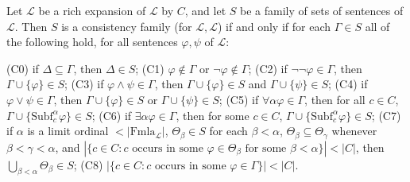 Let $\mathcal{L}$ be a rich expansion of $\mathcal{L}$ by $C$, and let $S$ be a family of sets of sentences of $\mathcal{L}$. Then $S$ is a consistency family (for $\mathcal{L}, \mathcal{L}$) if and only if for each $\Gamma \in S$ all of the following hold, for all sentences $\varphi, \psi$ of $\mathcal{L}$:

(C0) if $\Delta \subseteq \Gamma$, then $\Delta \in S$;
(C1) $\varphi \notin \Gamma$ or $\neg\varphi \notin \Gamma$;
(C2) if $\neg\neg\varphi \in \Gamma$, then $\Gamma \cup \{\varphi\} \in S$;
(C3) if $\varphi \wedge \psi \in \Gamma$, then $\Gamma \cup \{\varphi\} \in S$ and $\Gamma \cup \{\psi\} \in S$;
(C4) if $\varphi \vee \psi \in \Gamma$, then $\Gamma \cup \{\varphi\} \in S$ or $\Gamma \cup \{\psi\} \in S$;
(C5) if $\forall\alpha\varphi \in \Gamma$, then for all $c \in C$, $\Gamma \cup \{\text{Subf}_c^\alpha\varphi\} \in S$;
(C6) if $\exists\alpha\varphi \in \Gamma$, then for some $c \in C$, $\Gamma \cup \{\text{Subf}_c^\alpha\varphi\} \in S$;
(C7) if $\alpha$ is a limit ordinal $< |\text{Fmla}_\mathcal{L}|$, $\Theta_\beta \in S$ for each $\beta < \alpha$, $\Theta_\beta \subseteq \Theta_\gamma$ whenever $\beta < \gamma < \alpha$, and $|\{c \in C : c \text{ occurs in some } \varphi \in \Theta_\beta \text{ for some } \beta < \alpha\}| < |C|$, then $\bigcup_{\beta < \alpha} \Theta_\beta \in S$;
(C8) $|\{c \in C : c \text{ occurs in some } \varphi \in \Gamma\}| < |C|$.
